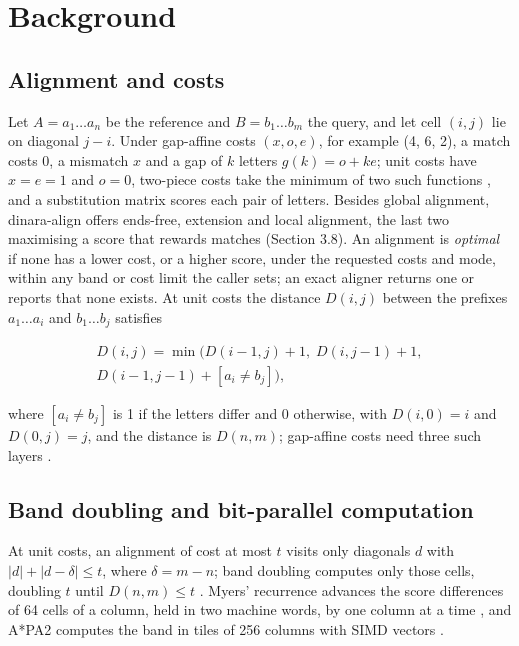 \section{Background}

\subsection{Alignment and costs}

Let \(A=a_1\dots a_n\) be the reference and \(B=b_1\dots b_m\) the query, and let cell \((i,j)\) lie on diagonal \(j-i\). Under gap-affine costs \((x, o, e)\), for example (4, 6, 2), a match costs 0, a mismatch \(x\) and a gap of \(k\) letters \(g(k)=o+ke\); unit costs have \(x=e=1\) and \(o=0\), two-piece costs take the minimum of two such functions \citep{Li2018minimap2}, and a substitution matrix scores each pair of letters. Besides global alignment, dinara-align offers ends-free, extension \citep{Li2018minimap2} and local alignment, the last two maximising a score that rewards matches (Section 3.8). An alignment is \emph{optimal} if none has a lower cost, or a higher score, under the requested costs and mode, within any band or cost limit the caller sets; an exact aligner returns one or reports that none exists. At unit costs the distance \(D(i,j)\) between the prefixes \(a_1\dots a_i\) and \(b_1\dots b_j\) satisfies

\begin{equation}\begin{gathered}
D(i,j) = \min\bigl(D(i-1,j)+1,\; D(i,j-1)+1,\\ D(i-1,j-1)+[a_i \ne b_j]\bigr),
\end{gathered}\end{equation}

where \([a_i \ne b_j]\) is 1 if the letters differ and 0 otherwise, with \(D(i,0)=i\) and \(D(0,j)=j\), and the distance is \(D(n,m)\); gap-affine costs need three such layers \citep{Gotoh1982}.

\subsection{Band doubling and bit-parallel computation}

At unit costs, an alignment of cost at most \(t\) visits only diagonals \(d\) with \(|d| + |d - \delta| \le t\), where \(\delta = m - n\); band doubling computes only those cells, doubling \(t\) until \(D(n,m) \le t\) \citep{Ukkonen1985}. Myers' recurrence advances the score differences of 64 cells of a column, held in two machine words, by one column at a time \citep{Myers1999bitvector}, and A*PA2 computes the band in tiles of 256 columns with SIMD vectors \citep{GrootKoerkamp2024astarpa2}.

